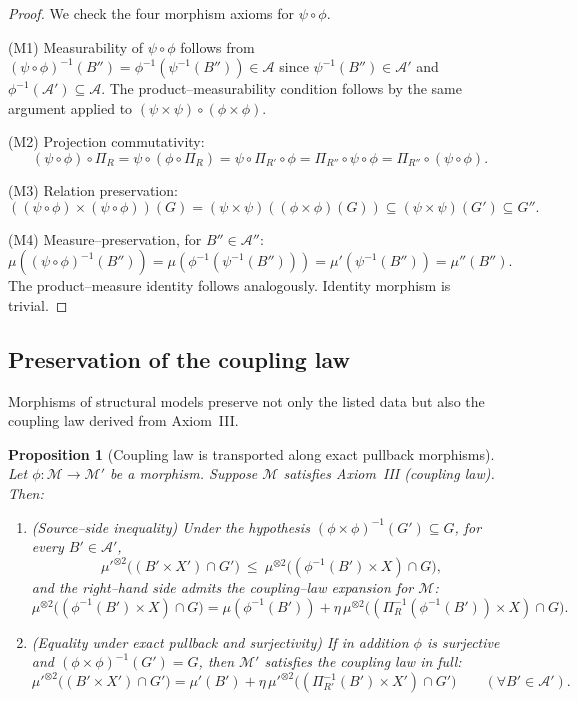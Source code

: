\documentclass[11pt]{article}
\numberwithin{equation}{section}
\newtheorem{proposition}[theorem]{Proposition}
\theoremstyle{definition}
\begin{document}
\begin{proof}
We check the four morphism axioms for $\psi\circ\phi$.

(M1) Measurability of $\psi\circ\phi$ follows from $(\psi\circ\phi)^{-1}(B'')=\phi^{-1}(\psi^{-1}(B''))\in\mathcal A$ since $\psi^{-1}(B'')\in\mathcal A'$ and $\phi^{-1}(\mathcal A')\subseteq\mathcal A$. The product--measurability condition follows by the same argument applied to $(\psi\times\psi)\circ(\phi\times\phi)$.

(M2) Projection commutativity:
\[
(\psi\circ\phi)\circ\Pi_R=\psi\circ(\phi\circ\Pi_R)=\psi\circ\Pi_{R'}\circ\phi=\Pi_{R''}\circ\psi\circ\phi=\Pi_{R''}\circ(\psi\circ\phi).
\]

(M3) Relation preservation:
\[
((\psi\circ\phi)\times(\psi\circ\phi))(G)=(\psi\times\psi)((\phi\times\phi)(G))\subseteq(\psi\times\psi)(G')\subseteq G''.
\]

(M4) Measure--preservation, for $B''\in\mathcal A''$:
\[
\mu((\psi\circ\phi)^{-1}(B''))=\mu(\phi^{-1}(\psi^{-1}(B'')))=\mu'(\psi^{-1}(B''))=\mu''(B'').
\]
The product--measure identity follows analogously. Identity morphism is trivial.
\end{proof}

\subsection{Preservation of the coupling law}

Morphisms of structural models preserve not only the listed data but also the coupling law derived from Axiom~III.

\begin{proposition}[Coupling law is transported along exact pullback morphisms]\label{prop:coupling-preserved}
Let $\phi:\mathcal M\to\mathcal M'$ be a morphism. Suppose $\mathcal M$ satisfies Axiom~III (coupling law). Then:
\begin{enumerate}[label=\emph{(\roman*)},nosep]
\item \emph{(Source--side inequality)} Under the hypothesis $(\phi\times\phi)^{-1}(G')\subseteq G$, for every $B'\in\mathcal A'$,
\[
\mu'^{\otimes2}\bigl((B'\times X')\cap G'\bigr)\ \le\ \mu^{\otimes2}\bigl((\phi^{-1}(B')\times X)\cap G\bigr),
\]
and the right--hand side admits the coupling--law expansion for $\mathcal M$:
\[
\mu^{\otimes2}\bigl((\phi^{-1}(B')\times X)\cap G\bigr)=\mu(\phi^{-1}(B'))+\eta\,\mu^{\otimes2}\bigl((\Pi_R^{-1}(\phi^{-1}(B'))\times X)\cap G\bigr).
\]
\item \emph{(Equality under exact pullback and surjectivity)} If in addition $\phi$ is surjective and $(\phi\times\phi)^{-1}(G')=G$, then $\mathcal M'$ satisfies the coupling law in full:
\[
\mu'^{\otimes2}\bigl((B'\times X')\cap G'\bigr)=\mu'(B')+\eta\,\mu'^{\otimes2}\bigl((\Pi_{R'}^{-1}(B')\times X')\cap G'\bigr)\qquad(\forall B'\in\mathcal A').
\]
\end{enumerate}
\end{proposition}
\end{document}
